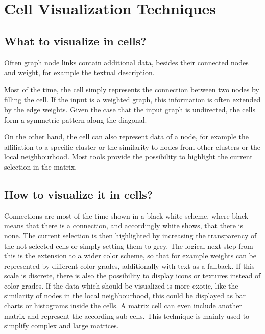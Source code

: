 %
%
% 
% 
% 


\chapter{Cell Visualization Techniques}\label{chap:celltypes}


\section{What to visualize in cells?}
Often graph node links contain additional data, besides their connected nodes and weight, for example the textual description.

Most of the time, the cell simply represents the connection between two nodes by filling the cell. If the input is a weighted graph, this information is often extended by the edge weights. Given the case that the input graph is undirected, the cells form a symmetric pattern along the diagonal. 

On the other hand, the cell can also represent data of a node, for example the affiliation to a specific cluster or the similarity to nodes from other clusters or the local neighbourhood. 
Most tools provide the possibility to highlight the current selection in the matrix.

\section{How to visualize it in cells?}

Connections are most of the time shown in a black-white scheme, where black means that there is a connection, and accordingly white shows, that there is none. The current selection is then highlighted by increasing the transparency of the not-selected cells or simply setting them to grey. The logical next step from this is the extension to a wider color scheme, so that for example weights can be represented by different color grades, additionally with text as a fallback. If this scale is discrete, there is also the possibility to display icons or textures instead of color grades.
If the data which should be visualized is more exotic, like the similarity of nodes in the local neighbourhood, this could be displayed as bar charts or histograms inside the cells. A matrix cell can even include another matrix and represent the according sub-cells. This technique is mainly used to simplify complex and large matrices.



